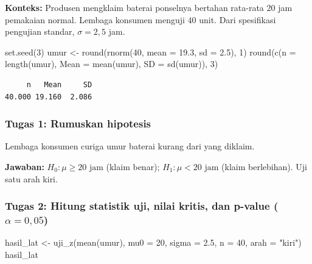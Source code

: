 \documentclass[
  indonesian,
  letterpaper,
]{book}
\newenvironment{Shaded}{\begin{snugshade}}{\end{snugshade}}
\newcommand{\AttributeTok}[1]{\textcolor[rgb]{0.40,0.45,0.13}{#1}}
\newcommand{\DecValTok}[1]{\textcolor[rgb]{0.68,0.00,0.00}{#1}}
\newcommand{\FloatTok}[1]{\textcolor[rgb]{0.68,0.00,0.00}{#1}}
\newcommand{\FunctionTok}[1]{\textcolor[rgb]{0.28,0.35,0.67}{#1}}
\newcommand{\NormalTok}[1]{\textcolor[rgb]{0.00,0.23,0.31}{#1}}
\newcommand{\OtherTok}[1]{\textcolor[rgb]{0.00,0.23,0.31}{#1}}
\newcommand{\StringTok}[1]{\textcolor[rgb]{0.13,0.47,0.30}{#1}}
\begin{document}
\textbf{Konteks:} Produsen mengklaim baterai ponselnya bertahan
rata-rata \(20\) jam pemakaian normal. Lembaga konsumen menguji \(40\)
unit. Dari spesifikasi pengujian standar, \(\sigma = 2{,}5\) jam.

\begin{Shaded}
\begin{Highlighting}[]
\FunctionTok{set.seed}\NormalTok{(}\DecValTok{3}\NormalTok{)}
\NormalTok{umur }\OtherTok{\textless{}{-}} \FunctionTok{round}\NormalTok{(}\FunctionTok{rnorm}\NormalTok{(}\DecValTok{40}\NormalTok{, }\AttributeTok{mean =} \FloatTok{19.3}\NormalTok{, }\AttributeTok{sd =} \FloatTok{2.5}\NormalTok{), }\DecValTok{1}\NormalTok{)}
\FunctionTok{round}\NormalTok{(}\FunctionTok{c}\NormalTok{(}\AttributeTok{n =} \FunctionTok{length}\NormalTok{(umur), }\AttributeTok{Mean =} \FunctionTok{mean}\NormalTok{(umur), }\AttributeTok{SD =} \FunctionTok{sd}\NormalTok{(umur)), }\DecValTok{3}\NormalTok{)}
\end{Highlighting}
\end{Shaded}

\begin{verbatim}
     n   Mean     SD 
40.000 19.160  2.086 
\end{verbatim}

\subsubsection{Tugas 1: Rumuskan
hipotesis}\label{tugas-1-rumuskan-hipotesis}

Lembaga konsumen curiga umur baterai kurang dari yang diklaim.

\textbf{Jawaban:} \(H_0: \mu \ge 20\text{ jam}\) (klaim benar);
\(H_1: \mu < 20\text{ jam}\) (klaim berlebihan). Uji satu arah kiri.

\subsubsection{\texorpdfstring{Tugas 2: Hitung statistik uji, nilai
kritis, dan p-value
(\(\alpha = 0{,}05\))}{Tugas 2: Hitung statistik uji, nilai kritis, dan p-value (\textbackslash alpha = 0\{,\}05)}}\label{tugas-2-hitung-statistik-uji-nilai-kritis-dan-p-value-alpha-005}

\begin{Shaded}
\begin{Highlighting}[]
\NormalTok{hasil\_lat }\OtherTok{\textless{}{-}} \FunctionTok{uji\_z}\NormalTok{(}\FunctionTok{mean}\NormalTok{(umur), }\AttributeTok{mu0 =} \DecValTok{20}\NormalTok{, }\AttributeTok{sigma =} \FloatTok{2.5}\NormalTok{, }\AttributeTok{n =} \DecValTok{40}\NormalTok{, }\AttributeTok{arah =} \StringTok{"kiri"}\NormalTok{)}
\NormalTok{hasil\_lat}
\end{Highlighting}
\end{Shaded}
\end{document}
